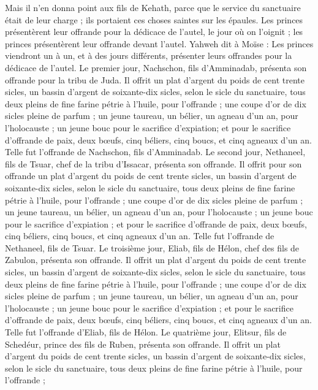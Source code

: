 \begin{multicols}{2}
Mais il n'en donna point aux fils de Kehath, parce que le service du sanctuaire était de leur charge ; ils portaient ces choses saintes sur les épaules.
Les princes présentèrent leur offrande pour la dédicace de l'autel, le jour où on l’oignit ; les princes présentèrent leur offrande devant l'autel.
Yahweh dit à Moïse : Les princes viendront un à un, et à des jours différents, présenter leurs offrandes pour la dédicace de l'autel.
Le premier jour, Nachschon, fils d’Amminadab, présenta son offrande pour la tribu de Juda.
Il offrit un plat d'argent du poids de cent trente sicles, un bassin d'argent de soixante-dix sicles, selon le sicle du sanctuaire, tous deux pleins de fine farine pétrie à l'huile, pour l’offrande ;
une coupe d'or de dix sicles pleine de parfum ;
un jeune taureau, un bélier, un agneau d'un an, pour l'holocauste ;
un jeune bouc pour le sacrifice d’expiation;
et pour le sacrifice d’offrande de paix, deux bœufs, cinq béliers, cinq boucs, et cinq agneaux d'un an. Telle fut l'offrande de Nachschon, fils d’Amminadab.
Le second jour, Nethaneel, fils de Tsuar, chef de la tribu d'Issacar, présenta son offrande.
Il offrit pour son offrande un plat d'argent du poids de cent trente sicles, un bassin d'argent de soixante-dix sicles, selon le sicle du sanctuaire, tous deux pleins de fine farine pétrie à l'huile, pour l’offrande ;
une coupe d'or de dix sicles pleine de parfum ;
un jeune taureau, un bélier, un agneau d'un an, pour l'holocauste ;
un jeune bouc pour le sacrifice d’expiation ;
et pour le sacrifice d’offrande de paix, deux bœufs, cinq béliers, cinq boucs, et cinq agneaux d'un an. Telle fut l'offrande de Nethaneel, fils de Tsuar.
Le troisième jour, Eliab, fils de Hélon, chef des fils de Zabulon, présenta son offrande.
Il offrit un plat d'argent du poids de cent trente sicles, un bassin d'argent de soixante-dix sicles, selon le sicle du sanctuaire, tous deux pleins de fine farine pétrie à l'huile, pour l’offrande ;
une coupe d'or de dix sicles pleine de parfum ;
un jeune taureau, un bélier, un agneau d'un an, pour l'holocauste ;
un jeune bouc pour le sacrifice d’expiation ;
et pour le sacrifice d’offrande de paix, deux bœufs, cinq béliers, cinq boucs, et cinq agneaux d'un an. Telle fut l'offrande d'Eliab, fils de Hélon.
Le quatrième jour, Elitsur, fils de Schedéur, prince des fils de Ruben, présenta son offrande.
Il offrit un plat d'argent du poids de cent trente sicles, un bassin d'argent de soixante-dix sicles, selon le sicle du sanctuaire, tous deux pleins de fine farine pétrie à l'huile, pour l’offrande ;

\end{multicols}
